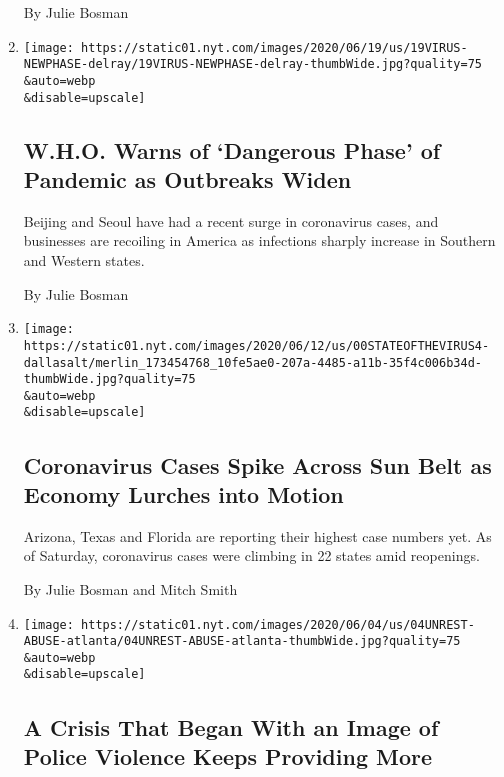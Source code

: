 \begin{enumerate}
  By Julie Bosman
\item
  \href{/2020/06/19/us/coronavirus-new-dangerous-phase.html}{}

  \texttt{[image: https://static01.nyt.com/images/2020/06/19/us/19VIRUS-NEWPHASE-delray/19VIRUS-NEWPHASE-delray-thumbWide.jpg?quality=75\\\&auto=webp\\\&disable=upscale]}

  \hypertarget{who-warns-of-dangerous-phase-of-pandemic-as-outbreaks-widen}{%
  \subsection{W.H.O. Warns of `Dangerous Phase' of Pandemic as Outbreaks
  Widen}\label{who-warns-of-dangerous-phase-of-pandemic-as-outbreaks-widen}}

  Beijing and Seoul have had a recent surge in coronavirus cases, and
  businesses are recoiling in America as infections sharply increase in
  Southern and Western states.

  By Julie Bosman
\item
  \href{/2020/06/14/us/coronavirus-united-states.html}{}

  \texttt{[image: https://static01.nyt.com/images/2020/06/12/us/00STATEOFTHEVIRUS4-dallasalt/merlin\_173454768\_10fe5ae0-207a-4485-a11b-35f4c006b34d-thumbWide.jpg?quality=75\\\&auto=webp\\\&disable=upscale]}

  \hypertarget{coronavirus-cases-spike-across-sun-belt-as-economy-lurches-into-motion}{%
  \subsection{Coronavirus Cases Spike Across Sun Belt as Economy Lurches
  into
  Motion}\label{coronavirus-cases-spike-across-sun-belt-as-economy-lurches-into-motion}}

  Arizona, Texas and Florida are reporting their highest case numbers
  yet. As of Saturday, coronavirus cases were climbing in 22 states amid
  reopenings.

  By Julie Bosman and Mitch Smith
\item
  \href{/2020/06/05/us/police-violence-george-floyd.html}{}

  \texttt{[image: https://static01.nyt.com/images/2020/06/04/us/04UNREST-ABUSE-atlanta/04UNREST-ABUSE-atlanta-thumbWide.jpg?quality=75\\\&auto=webp\\\&disable=upscale]}

  \hypertarget{a-crisis-that-began-with-an-image-of-police-violence-keeps-providing-more}{%
  \subsection{A Crisis That Began With an Image of Police Violence Keeps
  Providing
  More}\label{a-crisis-that-began-with-an-image-of-police-violence-keeps-providing-more}}


\end{enumerate}
